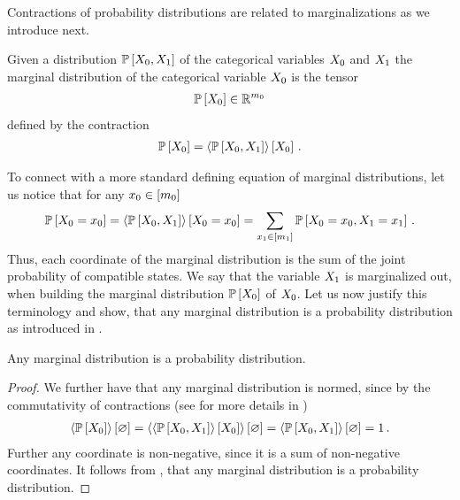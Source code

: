 


Contractions of probability distributions are related to marginalizations as we introduce next.

\begin{definition}
    \label{def:marginalProbability}
    Given a distribution $\mathbb{P}\left[X_{0},X_{1}\right]$ of the categorical variables $X_{0}$ and $X_{1}$ the marginal distribution of the categorical variable $X_{0}$ is the tensor
    \begin{align*}
        \probat{\exrandom} \in \rr^{\exranddim} %
    \end{align*}
    defined by the contraction
    \begin{align*}
        \mathbb{P}\left[X_{0}\right]
        = \left\langle \mathbb{P}\left[X_{0},X_{1}\right]\right\rangle \left[ X_{0} \right] \, .
    \end{align*}
\end{definition}

To connect with a more standard defining equation of marginal distributions, let us notice that for any $x_{0}\in[m_{0}]$
\begin{align*}
    \mathbb{P}\left[X_{0}=x_{0}\right]
    = \left\langle \mathbb{P}\left[X_{0},X_{1}\right]\right\rangle \left[ X_{0}=x_{0} \right]
    = \sum_{x_{1}\in[m_{1}]} \mathbb{P}\left[X_{0}=x_{0},X_{1}=x_{1}\right] \, .
\end{align*}
Thus, each coordinate of the marginal distribution is the sum of the joint probability of compatible states.
We say that the variable $X_{1}$ is marginalized out, when building the marginal distribution $\mathbb{P}\left[X_{0}\right]$ of $X_{0}$.
Let us now justify this terminology and show, that any marginal distribution is a probability distribution as introduced in .

\begin{theorem}
    \label{the:marginalContraction}
    Any marginal distribution is a probability distribution.
\end{theorem}
\begin{proof}
    We further have that any marginal distribution is normed, since by the commutativity of contractions (see for more details  in )
    \begin{align*}
        \left\langle \mathbb{P}\left[X_{0}\right]\right\rangle \left[ \varnothing \right] = \left\langle \left\langle \mathbb{P}\left[X_{0},X_{1}\right]\right\rangle \left[ X_{0} \right]\right\rangle \left[ \varnothing \right] = \left\langle \mathbb{P}\left[X_{0},X_{1}\right]\right\rangle \left[ \varnothing \right] = 1 \, .
    \end{align*}
    Further any coordinate is non-negative, since it is a sum of non-negative coordinates.
    It follows from , that any marginal distribution is a probability distribution.
\end{proof}

